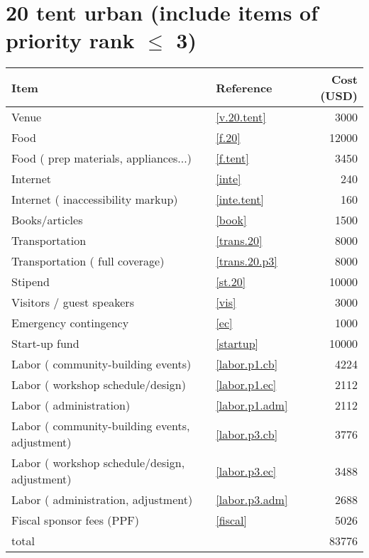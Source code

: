 \section*{20 tent urban (include items of priority rank $\leq$ 3)}
\begin{center}
\begin{tabular}{llr}
Item & Reference & Cost (USD) \\ \hline
Venue & \ref{v.20.tent} & 3000 \\
Food & \ref{f.20} & 12000 \\
Food ( prep materials, appliances...) & \ref{f.tent} & 3450 \\
Internet & \ref{inte} & 240 \\
Internet ( inaccessibility markup) & \ref{inte.tent} & 160 \\
Books/articles & \ref{book} & 1500 \\
Transportation & \ref{trans.20} & 8000 \\
Transportation ( full coverage) & \ref{trans.20.p3} & 8000 \\
Stipend & \ref{st.20} & 10000 \\
Visitors / guest speakers & \ref{vis} & 3000 \\
Emergency contingency & \ref{ec} & 1000 \\
Start-up fund & \ref{startup} & 10000 \\
Labor ( community-building events) & \ref{labor.p1.cb} & 4224 \\
Labor ( workshop schedule/design) & \ref{labor.p1.ec} & 2112 \\
Labor ( administration) & \ref{labor.p1.adm} & 2112 \\
Labor ( community-building events, adjustment) & \ref{labor.p3.cb} & 3776 \\
Labor ( workshop schedule/design, adjustment) & \ref{labor.p3.ec} & 3488 \\
Labor ( administration, adjustment) & \ref{labor.p3.adm} & 2688 \\
Fiscal sponsor fees (PPF) & \ref{fiscal} & 5026 \\ \hline
total &  & 83776
\end{tabular}
\end{center}
\newpage
